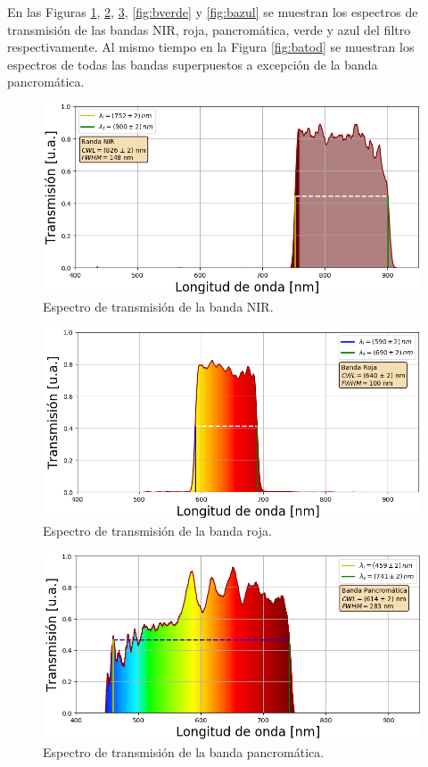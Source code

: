 En las Figuras \ref{fig:bnir}, \ref{fig:broja}, \ref{fig:bpanc}, \ref{fig:bverde} y \ref{fig:bazul} se muestran los espectros de transmisión de las bandas NIR, roja, pancromática, verde y azul del filtro respectivamente. Al mismo tiempo en la Figura \ref{fig:batod} se muestran los espectros de todas las bandas superpuestos a excepción de la banda pancromática.
\begin{figure}[H]
	\centering
	\includegraphics[width=1.0\textwidth]{Figs/microespectrometro/espectro_nirt.png}
	\caption{Espectro de transmisión de la banda NIR.}
	\label{fig:bnir}
\end{figure}
\begin{figure}[H]
	\centering
	\includegraphics[width=1.0\textwidth]{Figs/microespectrometro/espectro_rojat.png}
	\caption{Espectro de transmisión de la banda roja.}
	\label{fig:broja}
\end{figure}
\begin{figure}[H]
	\centering
	\includegraphics[width=1.0\textwidth]{Figs/microespectrometro/espectro_pancromaticat.png}
	\caption{Espectro de transmisión de la banda pancromática.}
	\label{fig:bpanc}
\end{figure}

